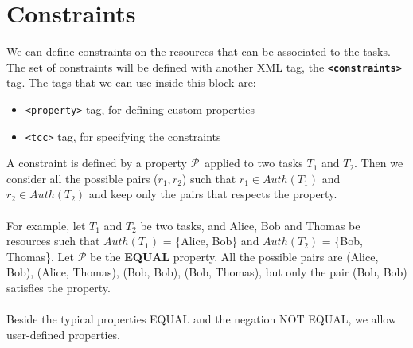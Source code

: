\documentclass{article}
\newcommand*{\xml}[1]{\texttt{<#1>}}
\begin{document}
\section{Constraints}
We can define constraints on the resources that can be associated to the tasks. The set of constraints will be defined with another XML tag, the \textbf{\xml{constraints}} tag. The tags that we can use inside this block are:
\begin{itemize}
    \item \xml{property} tag, for defining custom properties
    \item \xml{tcc} tag, for specifying the constraints
\end{itemize}
A constraint is defined by a property \( \mathcal{P} \)\ applied to two tasks \( T_{1} \) and \( T_{2} \). Then we consider all the possible pairs (\(r_{1}, r_{2}\)) such that \( r_{1} \in Auth(T_{1}) \) and \( r_{2} \in Auth(T_{2}) \) and keep only the pairs that respects the property. \\
\\
For example, let \( T_{1} \) and \( T_{2} \) be two tasks, and Alice, Bob and Thomas be resources such that \(Auth(T_{1})\) = \{Alice, Bob\} and \( Auth(T_{2}) \) = \{Bob, Thomas\}. Let \(\mathcal{P}\) be the \textbf{EQUAL} property.
All the possible pairs are (Alice, Bob), (Alice, Thomas), (Bob, Bob), (Bob, Thomas), but only the pair (Bob, Bob) satisfies the property. 
\\
\\
Beside the typical properties EQUAL and the negation NOT EQUAL, we allow user-defined properties. 
\end{document}
